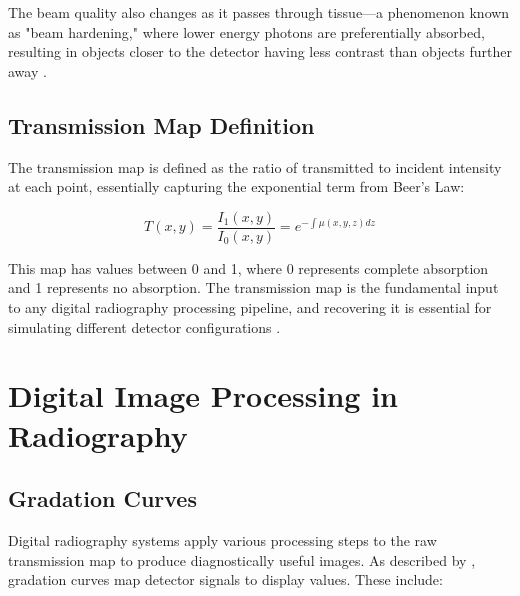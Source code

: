 \documentclass[nomenclature, english, bibtex]{kththesis}
\numberwithin{listing}{chapter}
\begin{document}
The beam quality also changes as it passes through tissue—a phenomenon known as "beam hardening," where lower energy photons are preferentially absorbed, resulting in objects closer to the detector having less contrast than objects further away \cite{bushberg2011essential}.


\subsection{Transmission Map Definition}
The transmission map is defined as the ratio of transmitted to incident intensity at each point, essentially capturing the exponential term from Beer's Law:

\begin{equation}
T(x,y) = \frac{I_1(x,y)}{I_0(x,y)} = e^{-\int \mu(x,y,z) dz}
\end{equation}

This map has values between 0 and 1, where 0 represents complete absorption and 1 represents no absorption. The transmission map is the fundamental input to any digital radiography processing pipeline, and recovering it is essential for simulating different detector configurations \cite{seibert2006flat}.


\section{Digital Image Processing in Radiography}
\subsection{Gradation Curves}
Digital radiography systems apply various processing steps to the raw transmission map to produce diagnostically useful images. As described by \cite{prokop2003principles}, gradation curves map detector signals to display values. These include:
\end{document}
